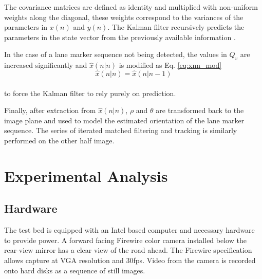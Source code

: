 \documentclass{article}
\begin{document}
The covariance matrices are defined as identity and multiplied with non-uniform weights along the diagonal, these weights correspond to the variances of the parameters in $x(n)$ and $y(n)$. The Kalman filter recursively predicts the parameters in the state vector from the previously available information \cite{hayes_statistical_1996,brookner_tracking_1998}.

In the case of a lane marker sequence not being detected, the values in $Q_v$ are increased significantly and $\hat{x}(n|n)$ is modified as Eq. \ref{eq:xnn_mod}
\begin{equation}
\hat{x}(n|n) = \hat{x}(n|n-1)
\label{eq:xnn_mod}
\end{equation}\\
to force the Kalman filter to rely purely on prediction.

Finally, after extraction from $\hat{x}(n|n)$, $\rho$ and $\theta$ are transformed back to the image plane and used to model the estimated orientation of the lane marker sequence. The series of iterated matched filtering and tracking is similarly performed on the other half image.

\section{Experimental Analysis}
\label{sec:exp_ana}
\subsection{Hardware}
The test bed is equipped with an Intel based computer and necessary hardware to provide power. A forward facing Firewire color camera installed below the rear-view mirror has a clear view of the road ahead. The Firewire specification allows capture at VGA resolution and 30fps. Video from the camera is recorded onto hard disks as a sequence of still images.
\end{document}
